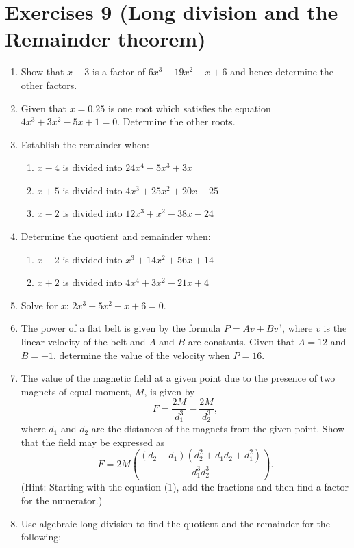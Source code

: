 \documentclass[
  12pt,
  oneside]{book}
\providecommand{\tightlist}{%
  \setlength{\itemsep}{0pt}\setlength{\parskip}{0pt}}
\theoremstyle{definition}
\theoremstyle{definition}
\theoremstyle{definition}
\theoremstyle{definition}
\theoremstyle{remark}
\begin{document}
\chapter*{Exercises 9 (Long division and the Remainder theorem)}\label{exercises-9-long-division-and-the-remainder-theorem}

\begin{enumerate}
\def\labelenumi{\arabic{enumi}.}
\item
  Show that \(x - 3\) is a factor of \(6x^3 - 19x^2 + x + 6\) and hence determine the other factors.
\item
  Given that \(x = 0.25\) is one root which satisfies the equation \(4x^3 + 3x^2 - 5x + 1 = 0\). Determine the other roots.
\item
  Establish the remainder when:

  \begin{enumerate}
  \def\labelenumii{\roman{enumii})}
  \tightlist
  \item
    \(x - 4\) is divided into \(24x^4 - 5x^3 + 3x\)
  \item
    \(x + 5\) is divided into \(4x^3 + 25x^2 + 20x - 25\)
  \item
    \(x - 2\) is divided into \(12x^3 + x^2 - 38x - 24\)
  \end{enumerate}
\item
  Determine the quotient and remainder when:

  \begin{enumerate}
  \def\labelenumii{\roman{enumii})}
  \tightlist
  \item
    \(x - 2\) is divided into \(x^3 + 14x^2 + 56x + 14\)
  \item
    \(x + 2\) is divided into \(4x^4 + 3x^2 - 21x + 4\)
  \end{enumerate}
\item
  Solve for \(x\): \(2x^3-5x^2-x+6=0\).
\item
  The power of a flat belt is given by the formula \(P = Av + Bv^3\), where \(v\) is the linear velocity of the belt and \(A\) and \(B\) are constants. Given that \(A = 12\) and \(B = -1\), determine the value of the velocity when \(P = 16\).
\item
  The value of the magnetic field at a given point due to the presence of two magnets of equal moment, \(M\), is given by
  \[F=\frac{2M}{d_1^3}-\frac{2M}{d_2^3}, \tag{1}\]
  where \(d_1\) and \(d_2\) are the distances of the magnets from the given point. Show that the field may be expressed as
  \[F=2M\left(\frac{(d_2-d_1)(d_2^2+d_1d_2+d_1^2)}{d_1^3d_2^3}\right). \tag{2}\]
  (Hint: Starting with the equation (1), add the fractions and then find a factor for the numerator.)
\item
  Use algebraic long division to find the quotient and the remainder for the following:


\end{enumerate}
\end{document}
